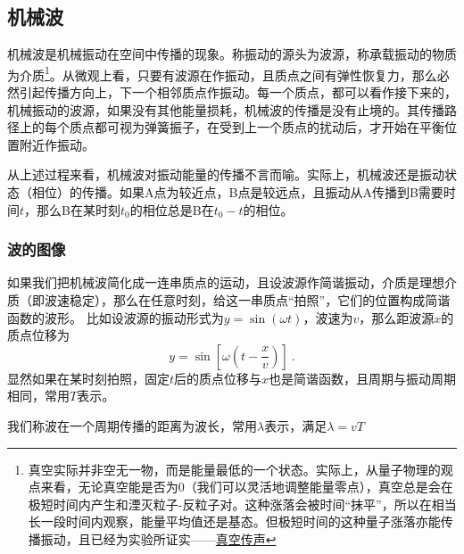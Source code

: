 
\subsection{机械波}
机械波是机械振动在空间中传播的现象。称振动的源头为波源，称承载振动的物质为介质\footnote{真空实际并非空无一物，而是能量最低的一个状态。实际上，从量子物理的观点来看，无论真空能是否为0（我们可以灵活地调整能量零点），真空总是会在极短时间内产生和湮灭粒子-反粒子对。这种涨落会被时间“抹平”，所以在相当长一段时间内观察，能量平均值还是基态。但极短时间的这种量子涨落亦能传播振动，且已经为实验所证实——\href{https://www.rmzxw.com.cn/c/2023-08-25/3399291.shtml}{真空传声}}。从微观上看，只要有波源在作振动，且质点之间有弹性恢复力，那么必然引起传播方向上，下一个相邻质点作振动。每一个质点，都可以看作接下来的，机械振动的波源，如果没有其他能量损耗，机械波的传播是没有止境的。其传播路径上的每个质点都可视为弹簧振子，在受到上一个质点的扰动后，才开始在平衡位置附近作振动。

从上述过程来看，机械波对振动能量的传播不言而喻。实际上，机械波还是振动状态（相位）的传播。如果A点为较近点，B点是较远点，且振动从A传播到B需要时间$t$，那么B在某时刻$t_0$的相位总是B在$t_0-t$的相位。
\subsubsection{波的图像}
如果我们把机械波简化成一连串质点的运动，且设波源作简谐振动，介质是理想介质（即波速稳定），那么在任意时刻，给这一串质点“拍照”，它们的位置构成简谐函数的波形。
比如设波源的振动形式为$y=\sin(\omega t)$，波速为$v$，那么距波源$x$的质点位移为
\begin{equation}
y=\sin [\omega (t-\frac{x}{v})]~.
\end{equation}
显然如果在某时刻拍照，固定$t$后的质点位移与$x$也是简谐函数，且周期与振动周期相同，常用$T$表示。

我们称波在一个周期传播的距离为波长，常用$\lambda $表示，满足$\lambda=vT$